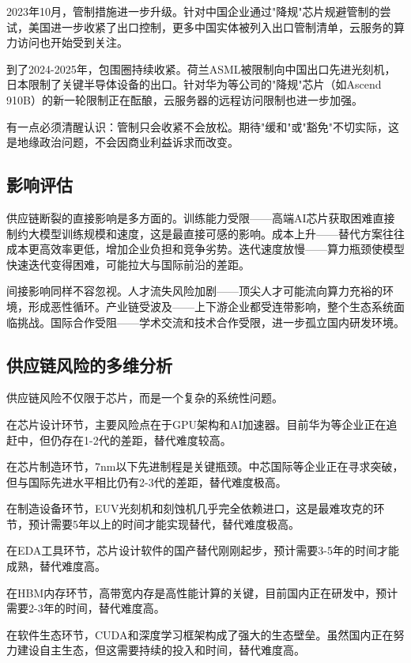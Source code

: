 2023年10月，管制措施进一步升级。针对中国企业通过"降规"芯片规避管制的尝试，美国进一步收紧了出口控制，更多中国实体被列入出口管制清单，云服务的算力访问也开始受到关注。

到了2024-2025年，包围圈持续收紧。荷兰ASML被限制向中国出口先进光刻机，日本限制了关键半导体设备的出口。针对华为等公司的"降规"芯片（如Ascend 910B）的新一轮限制正在酝酿，云服务器的远程访问限制也进一步加强。

有一点必须清醒认识：管制只会收紧不会放松。期待"缓和"或"豁免"不切实际，这是地缘政治问题，不会因商业利益诉求而改变。

\subsection{影响评估}

供应链断裂的直接影响是多方面的。训练能力受限——高端AI芯片获取困难直接制约大模型训练规模和速度，这是最直接可感的影响。成本上升——替代方案往往成本更高效率更低，增加企业负担和竞争劣势。迭代速度放慢——算力瓶颈使模型快速迭代变得困难，可能拉大与国际前沿的差距。

间接影响同样不容忽视。人才流失风险加剧——顶尖人才可能流向算力充裕的环境，形成恶性循环。产业链受波及——上下游企业都受连带影响，整个生态系统面临挑战。国际合作受阻——学术交流和技术合作受限，进一步孤立国内研发环境。

\subsection{供应链风险的多维分析}

供应链风险不仅限于芯片，而是一个复杂的系统性问题。

在芯片设计环节，主要风险点在于GPU架构和AI加速器。目前华为等企业正在追赶中，但仍存在1-2代的差距，替代难度较高。

在芯片制造环节，7nm以下先进制程是关键瓶颈。中芯国际等企业正在寻求突破，但与国际先进水平相比仍有2-3代的差距，替代难度极高。

在制造设备环节，EUV光刻机和刻蚀机几乎完全依赖进口，这是最难攻克的环节，预计需要5年以上的时间才能实现替代，替代难度极高。

在EDA工具环节，芯片设计软件的国产替代刚刚起步，预计需要3-5年的时间才能成熟，替代难度高。

在HBM内存环节，高带宽内存是高性能计算的关键，目前国内正在研发中，预计需要2-3年的时间，替代难度高。

在软件生态环节，CUDA和深度学习框架构成了强大的生态壁垒。虽然国内正在努力建设自主生态，但这需要持续的投入和时间，替代难度高。


